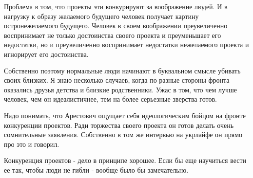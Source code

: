 \begin{itemize}
Проблема в том, что проекты эти конкурируют за воображение людей. И в нагрузку
к образу желаемого будущего человек получает картину остронежелаемого будущего.
Человек в своем воображении преувеличенно воспринимает не только достоинства
своего проекта и преуменьшает его недостатки, но и преувеличенно воспринимает
недостатки нежелаемого проекта и игнорирует его достоинства.

Собственно поэтому нормальные люди начинают в буквальном смысле убивать своих
близких. Я знаю несколько случаев, когда по разные стороны фронта оказались
друзья детства и близкие родственники. Ужас в том, что чем лучше человек, чем
он идеалистичнее, тем на более серьезные зверства готов.

Надо понимать, что Арестович ощущает себя идеологическим бойцом на фронте
конкуренции проектов. Ради торжества своего проекта он готов делать очень
сомнительные заявления. Собственно в том же интервью на укрлайфе он прямо про
это и говорил.

Конкуренция проектов - дело в принципе хорошее. Если бы еще научиться вести ее
так, чтобы люди не гибли - вообще было бы замечательно.

\end{itemize} %
